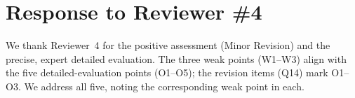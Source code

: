 \section*{Response to Reviewer \#4}
We thank Reviewer~4 for the positive assessment (Minor Revision) and the precise, expert detailed evaluation. The three weak points (W1--W3) align with the five detailed-evaluation points (O1--O5); the revision items (Q14) mark O1--O3. We address all five, noting the corresponding weak point in each.






